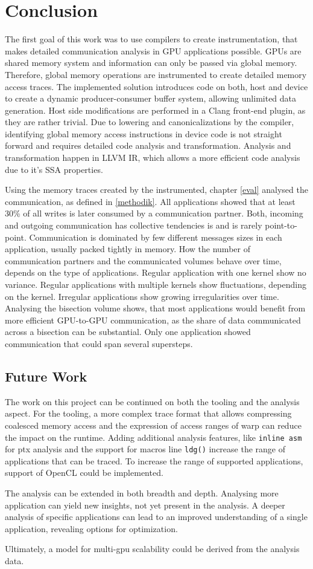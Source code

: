 \chapter{Conclusion}
The first goal of this work was to use compilers to create  instrumentation, that makes detailed communication analysis in
GPU applications possible. GPUs are shared memory system and information can only be passed via global memory. Therefore, global memory operations are instrumented to create detailed memory access traces. The implemented solution introduces code on both, host and device to create a dynamic producer-consumer buffer system, allowing unlimited data generation. Host side modifications are performed in a Clang front-end plugin, as they are rather trivial.
Due to lowering and canonicalizations by the compiler, identifying global memory access instructions in device code is not straight forward and requires detailed code analysis and transformation. Analysis and transformation happen in 
LLVM IR, which allows a more efficient code analysis due to it's SSA properties.

Using the memory traces created by the instrumented, chapter \ref{eval} analysed the communication, as defined in \ref{methodik}. All applications showed that at least 30\% of all writes is later consumed by a communication partner. Both, incoming and outgoing communication has collective tendencies is and is rarely point-to-point. Communication is dominated by few different messages sizes in each application, usually packed tightly in memory. How the number
of communication partners and the communicated volumes behave over time, depends on the type of applications. Regular application with one kernel show no variance. Regular applications with multiple kernels show fluctuations, depending on the
kernel. Irregular applications show growing irregularities over time. Analysing the bisection volume shows, that most applications would benefit from more efficient GPU-to-GPU communication, as the share of data communicated across 
a bisection can be substantial. Only one application showed communication that could span several supersteps.

\section{Future Work}
The work on this project can be continued on both the tooling and the analysis aspect. For the tooling, a more complex trace
format that allows compressing coalesced memory access and the expression of access ranges of warp can reduce the impact on 
the runtime. Adding additional analysis features, like \verb|inline asm| for ptx analysis and the support for macros 
line \verb|ldg()| increase the range of applications that can be traced. To increase the range of supported applications, support of OpenCL could be implemented.

The analysis can be extended in both breadth and depth. Analysing more application can yield new insights, not yet present
in the analysis. A deeper analysis of specific applications can lead to an improved understanding of a single application,
revealing options for optimization.

Ultimately, a model for multi-gpu scalability could be derived from the analysis data.